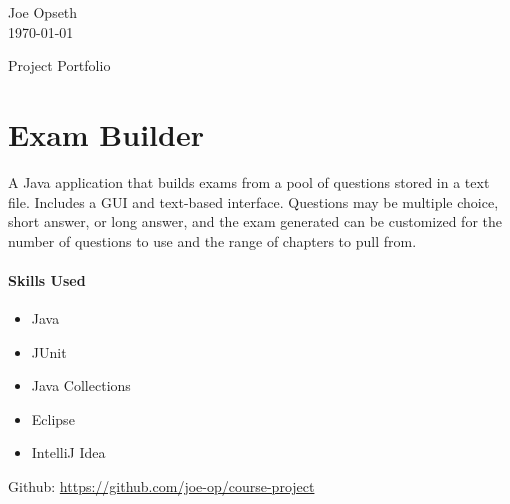 \documentclass[12pt]{article}
\makeatletter
\newcommand{\headline}[2]{\textbf{#1}: #2\\}
\newcommand{\examtitle}[1]{\gdef\@examtitle{#1\\}}
\newcommand{\course}[1]{\gdef\@course{#1}}
\newcommand{\@examtitle}{Exam ?\\}
\newcommand{\@student}{Joe Opseth}
\newcommand{\@course}{Applied Regression Analysis}
\newcommand{\@due}{\today}
\renewcommand{\maketitle}{\noindent
  \@student\\
  \@due\\
  {\par\centering\LARGE\@examtitle\par}
}
\newcommand\sectionsubtitle[1]{\def\@sectionsubtitle{#1}}
\makeatother
\begin{document}
\thispagestyle{empty}

\examtitle{Project Portfolio}




\maketitle

\sectionsubtitle{Object-Oriented Programming, University of Wisconsin-River Falls}
\section*{Exam Builder}%

A Java application that builds exams from a pool of questions stored in a text file. Includes a GUI and text-based interface. Questions may be multiple choice, short answer, or long answer, and the exam generated can be customized for the number of questions to use and the range of chapters to pull from. 

\paragraph{Skills Used}
\begin{itemize}
\item Java
\item JUnit
\item Java Collections
\item Eclipse
\item IntelliJ Idea
\end{itemize}

\vspace{\baselineskip}
Github: \url{https://github.com/joe-op/course-project}

\vspace{20pt}
\end{document}
